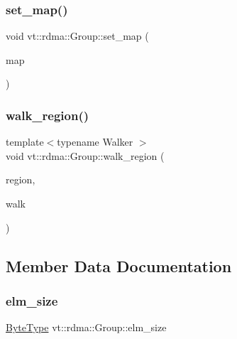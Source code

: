 \subsubsection{\texorpdfstring{set\+\_\+map()}{set\_map()}}
{\footnotesize\ttfamily void vt\+::rdma\+::\+Group\+::set\+\_\+map (\begin{DoxyParamCaption}\item[{\hyperlink{structvt_1_1rdma_1_1_group_a6a953be1b6d9907d49364a9a202d3379}{R\+D\+M\+A\+\_\+\+Map\+Type} const \&}]{map }\end{DoxyParamCaption})}

\mbox{\label{structvt_1_1rdma_1_1_group_a53c1941f50d8c724ea56c824cd514eee}} 
\subsubsection{\texorpdfstring{walk\+\_\+region()}{walk\_region()}}
{\footnotesize\ttfamily template$<$typename Walker $>$ \\
void vt\+::rdma\+::\+Group\+::walk\+\_\+region (\begin{DoxyParamCaption}\item[{\hyperlink{structvt_1_1rdma_1_1_group_a245644a7a0c40c547728a74e69c5e02f}{R\+D\+M\+A\+\_\+\+Region\+Type} const \&}]{region,  }\item[{Walker \&\&}]{walk }\end{DoxyParamCaption})\hspace{0.3cm}{\ttfamily [inline]}}



\subsection{Member Data Documentation}
\mbox{\label{structvt_1_1rdma_1_1_group_a99d69c11abeba7369b05fd97fe339551}} 
\subsubsection{\texorpdfstring{elm\+\_\+size}{elm\_size}}
{\footnotesize\ttfamily \hyperlink{namespacevt_aab8d55968084610ce3b17057981e9300}{Byte\+Type} vt\+::rdma\+::\+Group\+::elm\+\_\+size}

